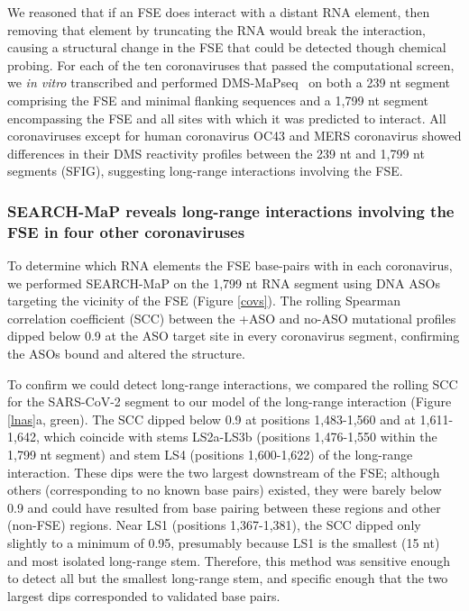 \documentclass[main.tex]{subfiles}
\begin{document}
We reasoned that if an FSE does interact with a distant RNA element, then removing that element by truncating the RNA would break the interaction, causing a structural change in the FSE that could be detected though chemical probing.
For each of the ten coronaviruses that passed the computational screen, we \textit{in vitro} transcribed and performed DMS-MaPseq~\cite{Zubradt2016} on both a 239 nt segment comprising the FSE and minimal flanking sequences and a 1,799 nt segment encompassing the FSE and all sites with which it was predicted to interact.
All coronaviruses except for human coronavirus OC43 and MERS coronavirus showed differences in their DMS reactivity profiles between the 239 nt and 1,799 nt segments (SFIG), suggesting long-range interactions involving the FSE.

\subsubsection{SEARCH-MaP reveals long-range interactions involving the FSE in four other coronaviruses}

To determine which RNA elements the FSE base-pairs with in each coronavirus, we performed SEARCH-MaP on the 1,799 nt RNA segment using DNA ASOs targeting the vicinity of the FSE (Figure \ref{covs}).
The rolling Spearman correlation coefficient (SCC) between the +ASO and no-ASO mutational profiles dipped below 0.9 at the ASO target site in every coronavirus segment, confirming the ASOs bound and altered the structure.

To confirm we could detect long-range interactions, we compared the rolling SCC for the SARS-CoV-2 segment to our model of the long-range interaction (Figure \ref{lnas}a, green).
The SCC dipped below 0.9 at positions 1,483-1,560 and at 1,611-1,642, which coincide with stems LS2a-LS3b (positions 1,476-1,550 within the 1,799 nt segment) and stem LS4 (positions 1,600-1,622) of the long-range interaction.
These dips were the two largest downstream of the FSE; although others (corresponding to no known base pairs) existed, they were barely below 0.9 and could have resulted from base pairing between these regions and other (non-FSE) regions.
Near LS1 (positions 1,367-1,381), the SCC dipped only slightly to a minimum of 0.95, presumably because LS1 is the smallest (15 nt) and most isolated long-range stem.
Therefore, this method was sensitive enough to detect all but the smallest long-range stem, and specific enough that the two largest dips corresponded to validated base pairs.
\end{document}
